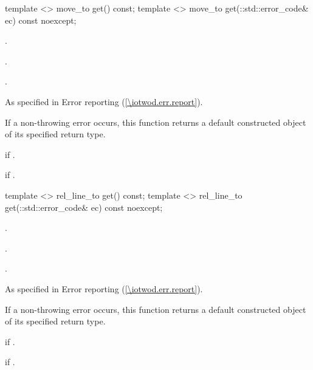 \begin{itemdecl}
    template <>
    move_to get() const;
    template <>
    move_to get(::std::error_code& ec) const noexcept;
\end{itemdecl}
\begin{itemdescr}
	\pnum
	\preconditions
	.
	
	\pnum
	.
	
	\pnum
	\returns
	.
	
	\pnum
	\throws
	As specified in Error reporting (\ref{\iotwod.err.report}).
	
	\pnum
	\remarks
	If a non-throwing error occurs, this function returns a default constructed object of its specified return type.
	
	\pnum
	\errors
	 if .
	
	\pnum
	 if .

\end{itemdescr}

\begin{itemdecl}
    template <>
    rel_line_to get() const;
    template <>
    rel_line_to get(::std::error_code& ec) const noexcept;
\end{itemdecl}
\begin{itemdescr}
	\pnum
	\preconditions
	.
	
	\pnum
	.
	
	\pnum
	\returns
	.
	
	\pnum
	\throws
	As specified in Error reporting (\ref{\iotwod.err.report}).
	
	\pnum
	\remarks
	If a non-throwing error occurs, this function returns a default constructed object of its specified return type.
	
	\pnum
	\errors
	 if .
	
	\pnum
	 if .

\end{itemdescr}

